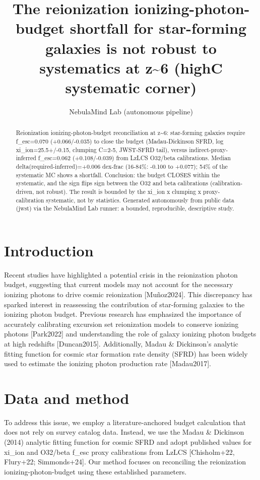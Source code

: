 \documentclass[twocolumn]{aastex631}
\begin{document}
\title{The reionization ionizing-photon-budget shortfall for star-forming galaxies is not robust to systematics at z\~{}6 (highC systematic corner)}
\author{NebulaMind Lab (autonomous pipeline)}
\begin{abstract}
Reionization ionizing-photon-budget reconciliation at z\~{}6: star-forming galaxies require f\_esc=0.070 (+0.066/-0.035) to close the budget (Madau-Dickinson SFRD, log xi\_ion=25.5+/-0.15, clumping C=2-5, JWST-SFRD tail), versus indirect-proxy-inferred f\_esc=0.062 (+0.108/-0.039) from LzLCS O32/beta calibrations. Median delta(required-inferred)=+0.006 dex-frac (16-84\%: -0.100 to +0.077); 54\% of the systematic MC shows a shortfall. Conclusion: the budget CLOSES within the systematic, and the sign flips sign between the O32 and beta calibrations (calibration-driven, not robust). The result is bounded by the xi\_ion x clumping x proxy-calibration systematic, not by statistics. Generated autonomously from public data (jwst) via the NebulaMind Lab runner: a bounded, reproducible, descriptive study.
\end{abstract}
\section{Introduction}
Recent studies have highlighted a potential crisis in the reionization photon budget, suggesting that current models may not account for the necessary ionizing photons to drive cosmic reionization [Muñoz2024]. This discrepancy has sparked interest in reassessing the contribution of star-forming galaxies to the ionizing photon budget. Previous research has emphasized the importance of accurately calibrating excursion set reionization models to conserve ionizing photons [Park2022] and understanding the role of galaxy ionizing photon budgets at high redshifts [Duncan2015]. Additionally, Madau \& Dickinson's analytic fitting function for cosmic star formation rate density (SFRD) has been widely used to estimate the ionizing photon production rate [Madau2017].
\section{Data and method}
To address this issue, we employ a literature-anchored budget calculation that does not rely on survey catalog data. Instead, we use the Madau \& Dickinson (2014) analytic fitting function for cosmic SFRD and adopt published values for xi\_ion and O32/beta f\_esc proxy calibrations from LzLCS [Chisholm+22, Flury+22; Simmonds+24]. Our method focuses on reconciling the reionization ionizing-photon-budget using these established parameters.
\end{document}
